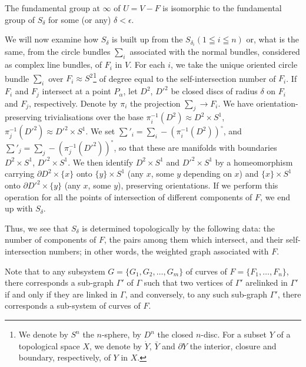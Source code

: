 \begin{coro*}
The fundamental group at $\infty$ of $U = V - F$ is isomorphic to the fundamental group of $S_\delta$ for some (or any) $\delta < \epsilon$.
\end{coro*}

We will now examine how $S_\delta$ is built up from the $S_{\delta_i} (1 \leqq i \leqq n)$ or, what is the same, from the circle bundles $\sum_i$ associated with the normal bundles, considered as complex line bundles, of $F_i$ in $V$. For each $i$, we take the unique oriented circle bundle $\sum_i$ over $F_i \approx S^{2}$\footnote{We denote by $S^n$ the $n$-sphere, by $D^n$ the closed $n$-disc. For a subset $Y$ of a topological space $X$, we denote by $\dot{Y}$, $\bar{Y}$ and $\partial Y$ the interior, closure and boundary, respectively, of $Y$ in $X$.} of degree equal to the self-intersection number of $F_i$. If $F_i$ and $F_j$ intersect at a point $P_\alpha$, let $D^2$, $D'^2$ be closed discs of radius $\delta$ on $F_i$ and $F_j$, respectively. Denote by $\pi_i$ the projection $\sum_j \to F_i$. We have orientation-preserving trivialisations over the base $\pi^{-1}_i(D^2) \approx D^2 \times S^1$, $\pi^{-1}_j (D'^2) \approx D'^2 \times S^1$. We set $\sum'_i = \sum_i - (\pi^{-1}_i (D^2))^\circ$, and $\sum'_j =\sum_j - (\pi^{-1}_j (D'^2))^\circ$, so that these are manifolds with boundaries $D^2 \times S^1$, $D'^2 \times S^1$. We then identify $D^2 \times S^1$ and $D'^2 \times S^1$ by a homeomorphism carrying $\partial D^2 \times \{x\}$ onto $\{y\} \times S^1$ (any $x$, some $y$ depending on $x$) and $\{x\} \times S^1$ onto $\partial D'^2 \times \{y\}$ (any $x$, some $y$), preserving  orientations. If we perform this operation for all the points of intersection of different components of $F$, we end up with $S_\delta$.

Thus, we see that $S_\delta$ is determined topologically by the following data: the number of components of $F$, the pairs among them which intersect, and their self-intersection numbers; in other words, the weighted graph associated with $F$.

Note that to any subsystem $G = \{G_1,G_2, \ldots, G_m\}$ of curves of $F = \{ F_1, \ldots, F_n \}$, there corresponds a sub-graph $\Gamma'$ of $\Gamma$ such that two vertices of $\Gamma'$ are\pageoriginale linked in $\Gamma'$ if and only if they are linked in $\Gamma$, and conversely, to any such sub-graph $\Gamma'$, there corresponds a sub-system of curves of $F$.

